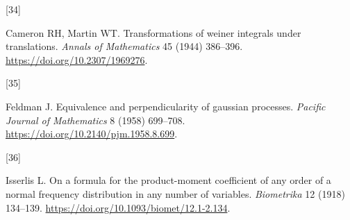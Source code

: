 \documentclass[
  american,
  11pt,
]{article}
\newlength{\cslhangindent}
\newlength{\csllabelwidth}
\newenvironment{CSLReferences}[2] %
 {\begin{list}{}{%
  \setlength{\itemindent}{0pt}
  \setlength{\leftmargin}{0pt}
  \setlength{\parsep}{0pt}
  \ifodd #1
   \setlength{\leftmargin}{\cslhangindent}
   \setlength{\itemindent}{-1\cslhangindent}
  \fi
  \setlength{\itemsep}{#2\baselineskip}}}
 {\end{list}}
\newcommand{\CSLLeftMargin}[1]{\parbox[t]{\csllabelwidth}{\strut#1\strut}}
\newcommand{\CSLRightInline}[1]{\parbox[t]{\linewidth - \csllabelwidth}{\strut#1\strut}}
\begin{document}
\begin{CSLReferences}{0}{0}
\CSLLeftMargin{{[}34{]} }%
\CSLRightInline{Cameron RH, Martin WT. Transformations of weiner
integrals under translations. \emph{Annals of Mathematics} 45 (1944)
386--396. \url{https://doi.org/10.2307/1969276}.}

\CSLLeftMargin{{[}35{]} }%
\CSLRightInline{Feldman J. Equivalence and perpendicularity of gaussian
processes. \emph{Pacific Journal of Mathematics} 8 (1958) 699--708.
\url{https://doi.org/10.2140/pjm.1958.8.699}.}

\CSLLeftMargin{{[}36{]} }%
\CSLRightInline{Isserlis L. On a formula for the product-moment
coefficient of any order of a normal frequency distribution in any
number of variables. \emph{Biometrika} 12 (1918) 134--139.
\url{https://doi.org/10.1093/biomet/12.1-2.134}.}

\end{CSLReferences}
\end{document}
